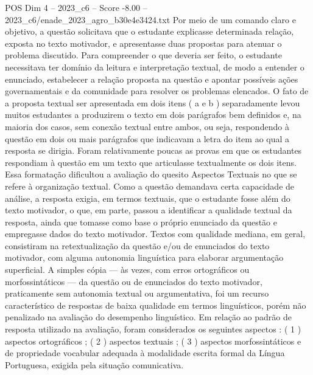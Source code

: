 \begin{textsample}{POS Dim 4 – 2023\_c6 – Score -8.00 – 2023\_c6/enade\_2023\_agro\_b30e4e3424.txt}
Por meio de um comando claro e objetivo, a questão solicitava que o estudante explicasse determinada relação, exposta no texto motivador, e apresentasse duas propostas para atenuar o problema discutido.
Para compreender o que deveria ser feito, o estudante necessitava ter domínio da leitura e interpretação textual, de modo a entender o enunciado, estabelecer a relação proposta na questão e apontar possíveis ações governamentais e da comunidade para resolver os problemas elencados.
O fato de a proposta textual ser apresentada em dois itens ( a e b ) separadamente levou muitos estudantes a produzirem o texto em dois parágrafos bem definidos e, na maioria dos casos, sem conexão textual entre ambos, ou seja, respondendo à questão em dois ou mais parágrafos que indicavam a letra do item ao qual a resposta se dirigia.
Foram relativamente poucas as provas em que os estudantes respondiam à questão em um texto que articulasse textualmente os dois itens.
Essa formatação dificultou a avaliação do quesito Aspectos Textuais no que se refere à organização textual.
Como a questão demandava certa capacidade de análise, a resposta exigia, em termos textuais, que o estudante fosse além do texto motivador, o que, em parte, passou a identificar a qualidade textual da resposta, ainda que tomasse como base o próprio enunciado da questão e empregasse dados do texto motivador.
Textos com qualidade mediana, em geral, consistiram na retextualização da questão e/ou de enunciados do texto motivador, com alguma autonomia linguística para elaborar argumentação superficial.
A simples cópia — às vezes, com erros ortográficos ou morfossintáticos — da questão ou de enunciados do texto motivador, praticamente sem autonomia textual ou argumentativa, foi um recurso característico de respostas de baixa qualidade em termos linguísticos, porém não penalizado na avaliação do desempenho linguístico.
Em relação ao padrão de resposta utilizado na avaliação, foram considerados os seguintes aspectos : ( 1 ) aspectos ortográficos ; ( 2 ) aspectos textuais ; ( 3 ) aspectos morfossintáticos e de propriedade vocabular adequada à modalidade escrita formal da Língua Portuguesa, exigida pela situação comunicativa.

\end{textsample}
